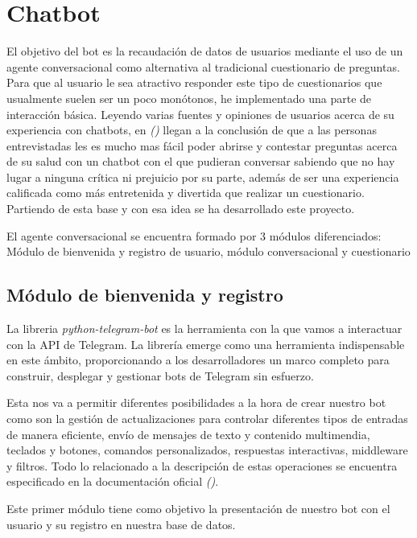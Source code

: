 \chapter{Chatbot}

El objetivo del bot es la recaudación de datos de usuarios mediante el uso de un agente conversacional como alternativa al tradicional cuestionario de preguntas. Para que al usuario le sea atractivo responder este tipo de cuestionarios que usualmente suelen ser un poco monótonos, he implementado una parte de interacción básica. Leyendo varias fuentes y opiniones de usuarios acerca de su experiencia con chatbots, 
 en \textit{(\cite{wellbeingchabot})} llegan a la conclusión de que a las personas entrevistadas les es mucho mas fácil poder abrirse y contestar preguntas acerca de su salud con un chatbot con el que pudieran conversar sabiendo que no hay lugar a ninguna crítica ni prejuicio por su parte, además de ser una experiencia calificada como más entretenida y divertida que realizar un cuestionario. Partiendo de esta base y con esa idea se ha desarrollado este proyecto. 

El agente conversacional se encuentra formado por 3 módulos diferenciados: Módulo de bienvenida y registro de usuario, módulo conversacional y cuestionario

\section{Módulo de bienvenida y registro}

La libreria \textit{python-telegram-bot} es la herramienta con la que vamos a interactuar con la API de Telegram. La librería emerge como una herramienta indispensable en este ámbito, proporcionando a los desarrolladores un marco completo para construir, desplegar y gestionar bots de Telegram sin esfuerzo.

Esta nos va a permitir diferentes posibilidades a la hora de crear nuestro bot como son la gestión de actualizaciones para controlar diferentes tipos de entradas de manera eficiente, envío de mensajes de texto y contenido multimendia, teclados y botones, comandos personalizados, respuestas interactivas, middleware y filtros. Todo lo relacionado a la descripción de estas operaciones se encuentra especificado en la documentación oficial \textit{(\cite{pythontelegrambot})}.

Este primer módulo tiene como objetivo la presentación de nuestro bot con el usuario y su registro en nuestra base de datos. \vspace{0.3cm}

